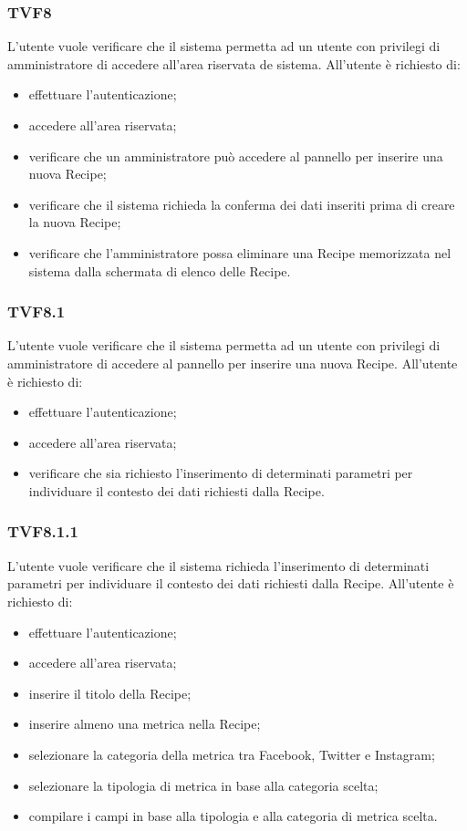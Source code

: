 		\subsubsection{TVF8}
			L'utente vuole verificare che il sistema permetta ad un utente con privilegi di amministratore di accedere all'area riservata de sistema. All'utente è richiesto di:
			\begin{itemize}
				\item effettuare l'autenticazione;
				\item accedere all'area riservata;
				\item verificare che un amministratore può accedere al pannello per inserire una nuova Recipe;
				\item verificare che il sistema richieda la conferma dei dati inseriti prima di creare la nuova Recipe;
				\item verificare che l'amministratore possa eliminare una Recipe memorizzata nel sistema dalla schermata di elenco delle Recipe.
			\end{itemize}
			
		\subsubsection{TVF8.1}
			L'utente vuole verificare che il sistema permetta ad un utente con privilegi di amministratore di accedere al pannello per inserire una nuova Recipe. All'utente è richiesto di:
			\begin{itemize}
				\item effettuare l'autenticazione;
				\item accedere all'area riservata;
				\item verificare che sia richiesto l'inserimento di determinati parametri per individuare il contesto dei dati richiesti dalla Recipe.
			\end{itemize}
			
		\subsubsection{TVF8.1.1}
			L'utente vuole verificare che il sistema richieda l'inserimento di determinati parametri per individuare il contesto dei dati richiesti dalla Recipe. All'utente è richiesto di:
			\begin{itemize}
				\item effettuare l'autenticazione;
				\item accedere all'area riservata;
				\item inserire il titolo della Recipe;
				\item inserire almeno una metrica nella Recipe;
				\item selezionare la categoria della metrica tra Facebook, Twitter e Instagram;
				\item selezionare la tipologia di metrica in base alla categoria scelta;
				\item compilare i campi in base alla tipologia e alla categoria di metrica scelta. 
			\end{itemize}
			
